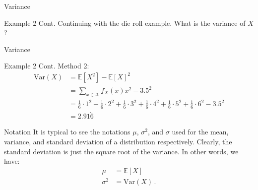 \documentclass[10pt]{beamer}
\begin{document}
\begin{frame}[fragile]{Variance}
\begin{exampleblock}{Example 2 Cont.}
    Continuing with the die roll example. What is the variance of \(X\)?

\end{exampleblock}
\end{frame}

\begin{frame}[fragile]{Variance}
\begin{exampleblock}{Example 2 Cont.}
Method 2:
\begin{equation*}\begin{aligned}
    \textrm{Var}\left(X\right) &= \mathbb{E}\left[X^2\right] - \mathbb{E}\left[X\right]^2\\
     &= \sum_{x \in \mathcal{X}} f_X\left(x\right)x^2 - 3.5^2\\
     &= \frac{1}{6}\cdot 1^2 + \frac{1}{6}\cdot 2^2 + \frac{1}{6}\cdot 3^2 + \frac{1}{6}\cdot 4^2 + \frac{1}{6}\cdot 5^2 + \frac{1}{6}\cdot 6^2 - 3.5^2\\
     &= 2.91\dot{6}
\end{aligned}\end{equation*}
\end{exampleblock}
\end{frame}

\begin{frame}[fragile]{Notation}
It is typical to see the notations \(\mu\), \(\sigma^2\), and \(\sigma\) used for the mean, variance, and standard deviation of a distribution respectively. Clearly, the standard deviation is just the square root of the variance. In other words, we have:
\begin{equation*}\begin{aligned}
    \mu &= \mathbb{E}\left[X\right]\\
    \sigma^2 &= \textrm{Var}\left(X\right)\,.
\end{aligned}\end{equation*}
\end{frame}
\end{document}
